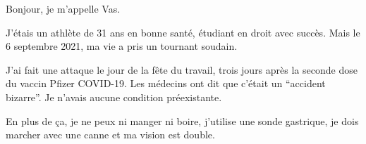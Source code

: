Bonjour, je m'appelle Vas.

J'étais un athlète de 31 ans en bonne santé, étudiant en droit avec succès. Mais
le 6 septembre 2021, ma vie a pris un tournant soudain.

J'ai fait une attaque le jour de la fête du travail, trois jours après la
seconde dose du vaccin Pfizer COVID-19. Les médecins ont dit que c'était un
“accident bizarre”. Je n'avais aucune condition préexistante.

En plus de ça, je ne peux ni manger ni boire, j'utilise une sonde gastrique, je
dois marcher avec une canne et ma vision est double.


